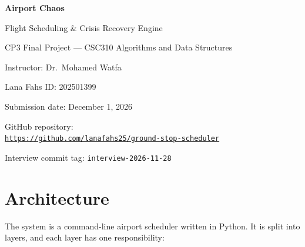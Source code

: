 \documentclass[11pt]{article}
\begin{document}
\begin{titlepage}
\centering
\vspace*{3cm}
{\LARGE\bfseries Airport Chaos\par}
\vspace{0.4cm}
{\Large Flight Scheduling \& Crisis Recovery Engine\par}
\vspace{1.2cm}
{\large CP3 Final Project --- CSC310 Algorithms and Data Structures\par}
\vspace{0.3cm}
{\large Instructor: Dr.\ Mohamed Watfa\par}
\vspace{1.5cm}
{\large Lana Fahs \quad ID: 202501399\par}
\vspace{1.5cm}
{\large Submission date: December 1, 2026\par}
\vspace{0.8cm}
{\large GitHub repository:\\[0.2cm]
\href{https://github.com/lanafahs25/ground-stop-scheduler}{\texttt{https://github.com/lanafahs25/ground-stop-scheduler}}\par}
\vfill
{\small Interview commit tag: \texttt{interview-2026-11-28}\par}
\end{titlepage}

\section{Architecture}

The system is a command-line airport scheduler written in Python. It is split
into layers, and each layer has one responsibility:
\end{document}
